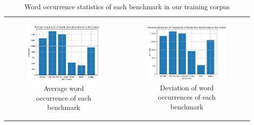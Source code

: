 \begin{table}[h]
  \centering
  \begin{tabular}{cc}
    \begin{subfigure}{0.47\textwidth}
      \includegraphics[width=\linewidth]{img/benchmark-occ.png}
      \caption{Average word occurrence of each benchmark}
    \label{fig:occ-avg}
    \end{subfigure} &
    \begin{subfigure}{0.47\textwidth}
      \includegraphics[width=\linewidth]{img/benchmark-std.png}
      \caption{Deviation of word occurrences of each benchmark}
    \label{fig:occ-dev}
    \end{subfigure}
  \end{tabular}
  \caption{Word occurrence statistics of each benchmark in our training corpus}
  \label{tab:occ-stats}
\end{table}


